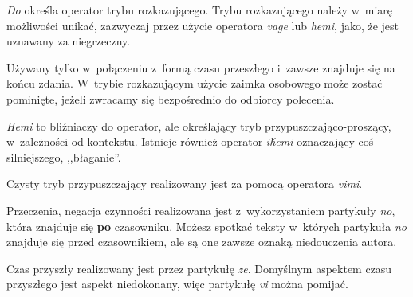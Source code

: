 \begin{spacing}{1.1}

\skipline

\emph{Do} określa operator trybu rozkazującego. Trybu rozkazującego należy 
w~miarę możliwości unikać, zazwyczaj przez użycie operatora \emph{vage} lub 
\emph{hemi}, jako, że jest uznawany za niegrzeczny.

Używany tylko w~połączeniu z~formą czasu przeszłego i~zawsze 
znajduje się na końcu zdania. W~trybie rozkazującym użycie zaimka osobowego 
może zostać pominięte, jeżeli zwracamy się bezpośrednio do odbiorcy polecenia.



\emph{Hemi} to bliźniaczy do operator, ale określający tryb 
przypuszczająco-proszący, w~zależności od kontekstu. Istnieje również operator 
\emph{ih́emi} oznaczający coś silniejszego, ,,błaganie''.



Czysty tryb przypuszczający realizowany jest za pomocą operatora \emph{vimi}.


Przeczenia, negacja czynności realizowana jest z~wykorzystaniem partykuły 
\emph{no}, która znajduje się \textbf{po} czasowniku. Możesz spotkać teksty
w~których partykuła \emph{no} znajduje się przed czasownikiem, ale są one
zawsze oznaką niedouczenia autora.





Czas przyszły realizowany jest przez partykułę \emph{ze}. Domyślnym aspektem 
czasu przyszłego jest aspekt niedokonany, więc partykułę \emph{vi} można 
pomijać.



\end{spacing}
